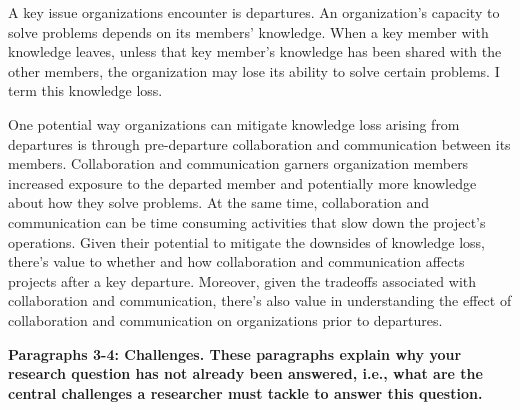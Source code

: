 \documentclass[12pt,notitlepage]{article}
\begin{document}
A key issue organizations encounter is departures. An organization's capacity to solve problems depends on its members' knowledge. When a key member with  knowledge leaves, unless that key member's knowledge has been shared with the other members, the organization may lose its ability to solve certain problems. I term this knowledge loss. 

One potential way organizations can mitigate knowledge loss arising from departures is through pre-departure collaboration and communication between its members. Collaboration and communication garners organization members increased exposure to the departed member and potentially more knowledge about how they solve problems. At the same time, collaboration and communication can be time consuming activities that slow down the project's operations. Given  their potential to mitigate the downsides of knowledge loss, there's value to whether and how collaboration and communication affects projects after a key departure. Moreover, given the tradeoffs associated with collaboration and communication, there's also value in understanding the effect of collaboration and communication on organizations prior to departures. 

\textbf{Paragraphs 3-4: Challenges. These paragraphs explain why your research question has not already been answered, i.e., what are the central challenges a researcher must tackle to answer this question.}
\end{document}
